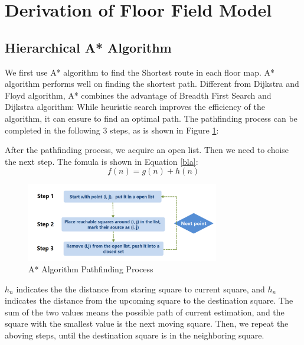 \documentclass{mcmthesis}
\begin{document}
\section{Derivation of Floor Field Model}
\subsection{Hierarchical A* Algorithm}
    We first use A* algorithm to find the Shortest route in each floor map. A* algorithm performs well on finding the shortest path. Different from Dijkstra and Floyd algorithm, A* combines the advantage of Breadth First Search and Dijkstra algorithm: While heuristic search improves the efficiency of the algorithm, it can ensure to find an optimal path. The pathfinding process can be completed in the following 3 steps, as is shown in Figure \ref{A_star}:

    After the pathfinding process, we acquire an open list. Then  we need to choise the next step. The fomula is shown in Equation \eqref{bla}:
    \begin{equation}
        f(n) = g(n) + h(n)
    \label{bla}
    \end{equation}

    \begin{figure}[H]
        \centering
        \includegraphics[width=0.75\textwidth]{A_star.png}
        \caption{A* Algorithm Pathfinding Process}
        \label{A_star}
    \end{figure}


    $h_n$ indicates the the distance from staring square to current square, and $h_n$ indicates the distance from the upcoming square to the destination square. The sum of the two values means the possible path of current estimation, and the square with the  smallest value is the next moving square. Then, we repeat the aboving steps, until the destination square is in the neighboring square. 
\end{document}
